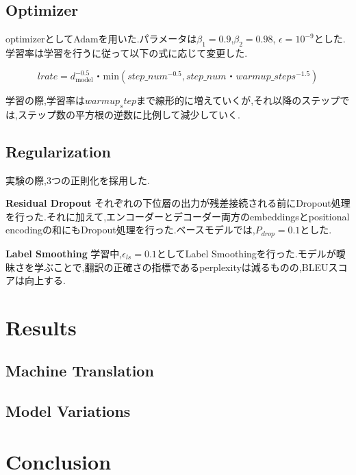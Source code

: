 \documentclass{jarticle}     %
\begin{document}
\subsection{Optimizer}
optimizerとしてAdamを用いた.パラメータは$\beta_\mathrm{1} = 0.9$,$\beta_\mathrm{2} = 0.98$, $\epsilon = 10^{-9}$とした.学習率は学習を行うに従って以下の式に応じて変更した.

\begin{equation}
  lrate = d_\mathrm{model}^{-0.5}・\mathrm{min}(step\_num^{-0.5},step\_num・warmup\_steps^{-1.5})
\end{equation}

学習の際,学習率は$warmup_step$まで線形的に増えていくが,それ以降のステップでは,ステップ数の平方根の逆数に比例して減少していく.

\subsection{Regularization}
実験の際,3つの正則化を採用した.

\textbf{Residual Dropout}
それぞれの下位層の出力が残差接続される前にDropout処理を行った.それに加えて,エンコーダーとデコーダー両方のembeddingsとpositional encodingの和にもDropout処理を行った.ベースモデルでは,$P_{drop} = 0.1$とした.

\textbf{Label Smoothing}
学習中,$\epsilon_{ls} = 0.1$としてLabel Smoothingを行った.モデルが曖昧さを学ぶことで,翻訳の正確さの指標であるperplexityは減るものの,BLEUスコアは向上する.

\section{Results}

\subsection{Machine Translation}

\subsection{Model Variations}

\section{Conclusion}




\end{document}
